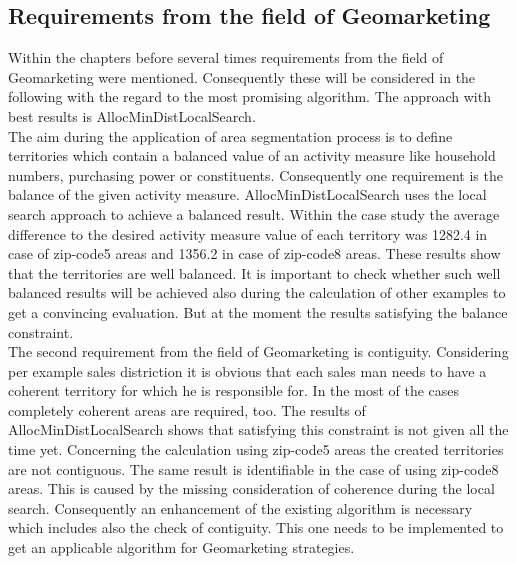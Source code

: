 \subsection{Requirements from the field of Geomarketing}
Within the chapters before several times requirements from the field of Geomarketing were mentioned. Consequently these will be considered in the following with the regard to the most promising algorithm. The approach with best results is AllocMinDistLocalSearch. \\
The aim during the application of area segmentation process is to define territories which contain a balanced value of an activity measure like household numbers, purchasing power or constituents. Consequently one requirement is the balance of the given activity measure. AllocMinDistLocalSearch uses the local search approach to achieve a balanced result. Within the case study the average difference to the desired activity measure value of each territory was 1282.4 in case of zip-code5 areas and 1356.2 in case of zip-code8 areas. These results show that the territories are well balanced. It is important to check whether such well balanced results will be achieved also during the calculation of other examples to get a convincing evaluation. But at the moment the results satisfying the balance constraint.\\
The second requirement from the field of Geomarketing is contiguity. Considering per example sales distriction it is obvious that each sales man needs to have a coherent territory for which he is responsible for. In the most of the cases completely coherent areas are required, too. The results of AllocMinDistLocalSearch shows that satisfying this constraint is not given all the time yet. Concerning the calculation using zip-code5 areas the created territories are not contiguous. The same result is identifiable in the case of using zip-code8 areas. This is caused by the missing consideration of coherence during the local search. Consequently an enhancement of the existing algorithm is necessary which includes also the check of contiguity. This one needs to be implemented to get an applicable algorithm for Geomarketing strategies. \\
